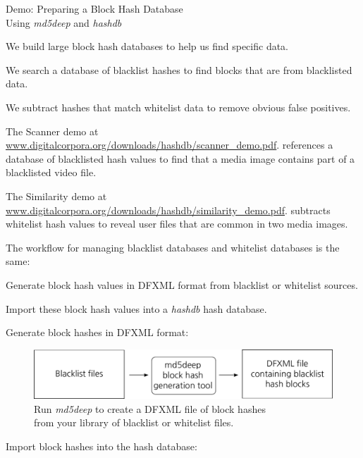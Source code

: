 \documentclass[12pt,twoside]{article}
\newcommand{\hdb}{\emph{hashdb}\xspace}
\newcommand{\mdd}{\emph{md5deep}\xspace}
\begin{document}
\begin{center}
\Large Demo: Preparing a Block Hash Database \\
\large Using \mdd and \hdb
\end{center}

We build large block hash databases to help us find specific data.
\begin{compactitem}
\item We search a database of blacklist hashes to find blocks
that are from blacklisted data.
\item We subtract hashes that match whitelist data
to remove obvious false positives.
\end{compactitem}
The Scanner demo at
\url{www.digitalcorpora.org/downloads/hashdb/scanner\_demo.pdf}.
references a database of blacklisted hash values
to find that a media image contains part of a blacklisted video file.

The Similarity demo at
\url{www.digitalcorpora.org/downloads/hashdb/similarity\_demo.pdf}.
subtracts whitelist hash values
to reveal user files that are common in two media images.

The workflow for managing blacklist databases and whitelist databases
is the same:
\begin{compactenum}
\item Generate block hash values in DFXML format
from blacklist or whitelist sources.
\item Import these block hash values into a \hdb hash database.
\end{compactenum}

Generate block hashes in DFXML format:

\begin{figure}[H]
  \center
  \includegraphics[scale=0.6]{drawings/md5deep}
  \caption*{Run \mdd to create a DFXML file of block hashes \\
            from your library of blacklist or whitelist files.}
\end{figure}

Import block hashes into the hash database:
\end{document}
